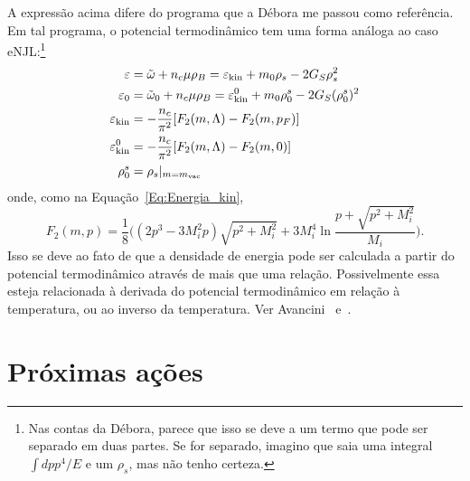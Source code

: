 A expressão acima difere do programa que a Débora me passou como referência. Em tal programa, o potencial termodinâmico tem uma forma análoga ao caso eNJL:\footnote{Nas contas da Débora, parece que isso se deve a um termo que pode ser separado em duas partes. Se for separado, imagino que saia uma integral $\int dp p^4/E$ e um $\rho_s$, mas não tenho certeza.}
\begin{subequations}\label{Eq:Pot_termodinamico_2}
\begin{align}
	\varepsilon &= \tilde{\omega} + n_c\mu\rho_B = \varepsilon_{\rm{kin}} + m_0\rho_s - 2G_S\rho_s^2 \\
	\varepsilon_0 &= \tilde{\omega}_0 + n_c\mu\rho_B = \varepsilon_{\rm{kin}}^0 + m_0\rho_0^s - 2G_S(\rho_0^s)^2 \\
	\varepsilon_{\rm{kin}} &= -\frac{n_c}{\pi^2} [F_2(m, \Lambda) - F_2(m, p_F)] \\
	\varepsilon_{\rm{kin}}^0 &= -\frac{n_c}{\pi^2} [F_2(m, \Lambda) - F_2(m, 0)] \\
	\rho_0^s &= \rho_s|_{m = m_{\rm{vac}}}
\end{align}
\end{subequations}
%
onde, como na Equação~\eqref{Eq:Energia_kin},
\begin{equation}
	F_2(m, p) = \frac{1}{8}\Big((2p^3 - 3M_i^2p)\sqrt{p^2 + M_i^2} + 3M_i^4\ln\frac{p + \sqrt{p^2 + M_i^2}}{M_i}\Big).
\end{equation}
%
Isso se deve ao fato de que a densidade de energia pode ser calculada a partir do potencial termodinâmico através de mais que uma relação. Possivelmente essa esteja relacionada à derivada do potencial termodinâmico em relação à temperatura, ou ao inverso da temperatura. Ver Avancini~\cite{Avancini2004} e~\cite{Avancini2006}.


\section{Próximas ações}

